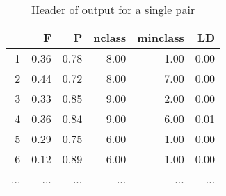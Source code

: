 \documentclass[paper=a4, fontsize=11pt]{scrartcl}					%
\numberwithin{equation}{section}									%
\numberwithin{figure}{section}										%
\numberwithin{table}{section}										%
\begin{document}
\begin{landscape}

\begin{table}[ht]
\centering
\begin{tabular}{rrrrrr}
  \hline
 & F & P & nclass & minclass & LD \\ 
  \hline
1 & 0.36 & 0.78 & 8.00 & 1.00 & 0.00 \\ 
  2 & 0.44 & 0.72 & 8.00 & 7.00 & 0.00 \\ 
  3 & 0.33 & 0.85 & 9.00 & 2.00 & 0.00 \\ 
  4 & 0.36 & 0.84 & 9.00 & 6.00 & 0.01 \\ 
  5 & 0.29 & 0.75 & 6.00 & 1.00 & 0.00 \\ 
  6 & 0.12 & 0.89 & 6.00 & 1.00 & 0.00 \\
  ... & ... & ... & ... & ...& ... \\ 
   \hline
\end{tabular}
\caption*{Header of output for a single pair}
\end{table}

\vspace{2cm}



\end{landscape}
\end{document}
